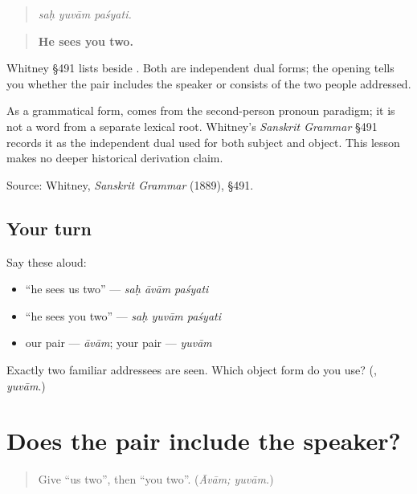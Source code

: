 \begin{quote}
\emph{saḥ yuvām paśyati.}
\end{quote}

\begin{quote}
\textbf{He sees you two.}
\end{quote}

Whitney §491 lists \textbf{} beside \textbf{}. Both are independent dual forms; the opening tells you whether the pair includes the speaker or consists of the two people addressed.

\begin{cousinweb}
As a grammatical form, \textbf{} comes from the second-person pronoun paradigm; it is not a word from a separate lexical root. Whitney's \emph{Sanskrit Grammar} §491 records it as the independent dual used for both subject and object. This lesson makes no deeper historical derivation claim.

Source: Whitney, \emph{Sanskrit Grammar} (1889), §491.
\end{cousinweb}

\subsection*{Your turn}
Say these aloud:

\begin{itemize}
\raggedright
  \item “he sees us two” — \emph{saḥ āvām paśyati}
  \item “he sees you two” — \emph{saḥ yuvām paśyati}
  \item our pair — \emph{āvām}; your pair — \emph{yuvām}
\end{itemize}

\begin{tcolorbox}[breakable,colback=teal!4,colframe=teal!35!black,title={Before you move on}]
Exactly two familiar addressees are seen. Which object form do you use? (\textbf{}, \emph{yuvām}.)
\end{tcolorbox}
\section[Practice]{Does the pair include the speaker?}

\label{lesson:SA-C261-dual-object-practice}



\begin{quote}
Give “us two”, then “you two”. (\emph{Āvām; yuvām.})
\end{quote}

